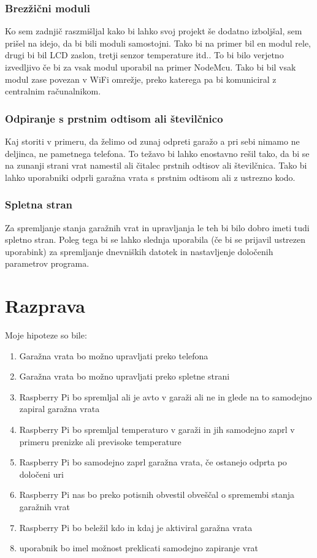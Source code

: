\documentclass[11pt]{article}
\begin{document}
\subsubsection{Brezžični moduli}
Ko sem zadnjič raszmišljal kako bi lahko svoj projekt še dodatno izboljšal, sem prišel na idejo, da bi bili moduli samostojni. Tako bi na primer bil en modul rele, drugi bi bil LCD zaslon, tretji senzor temperature itd..
To bi bilo verjetno izvedljivo če bi za vsak modul uporabil na primer NodeMcu\cite{NodeMcu}. Tako bi bil vsak modul zase povezan v WiFi omrežje, preko katerega pa bi komuniciral z centralnim računalnikom.

\subsubsection{Odpiranje s prstnim odtisom ali številčnico}
Kaj storiti v primeru, da želimo od zunaj odpreti garažo a pri sebi nimamo ne deljinca, ne pametnega telefona. To težavo bi lahko enostavno rešil tako, da bi se na zunanji strani vrat namestil ali čitalec prstnih odtisov ali številčnica. Tako bi lahko uporabniki odprli garažna vrata s prstnim odtisom ali z ustrezno kodo.

\subsubsection{Spletna stran}
Za spremljanje stanja garažnih vrat in upravljanja le teh bi bilo dobro imeti tudi spletno stran. Poleg tega bi se lahko slednja uporabila (če bi se prijavil ustrezen uporabink) za spremljanje dnevniških datotek in nastavljenje določenih parametrov programa.
\newpage

\section{Razprava}
Moje hipoteze so bile:
\begin{enumerate}
    \item Garažna vrata bo možno upravljati preko telefona
    \item Garažna vrata bo možno upravljati preko spletne strani
    \item Raspberry Pi bo spremljal ali je avto v garaži ali ne in glede na to samodejno zapiral garažna vrata
    \item Raspberry Pi bo spremljal temperaturo v garaži in jih samodejno zaprl v primeru prenizke ali previsoke temperature
    \item Raspberry Pi bo samodejno zaprl garažna vrata, če ostanejo odprta po določeni uri
    \item Raspberry Pi nas bo preko potisnih obvestil obveščal o spremembi stanja garažnih vrat
    \item Raspberry Pi bo beležil kdo in kdaj je aktiviral garažna vrata
    \item uporabnik bo imel možnost preklicati samodejno zapiranje vrat
\end{enumerate}
\end{document}
